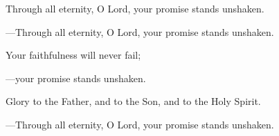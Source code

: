 \responsory
\begin{hangpar}

Through all eternity, O Lord, your promise stands unshaken.

{\color{red}---\thinspace}Through all eternity, O Lord, your promise stands unshaken.

\medskip Your faithfulness will never fail;

{\color{red}---\thinspace}your promise stands unshaken.

\medskip Glory to the Father, and to the Son, and to the Holy Spirit.

{\color{red}---\thinspace}Through all eternity, O Lord, your promise stands unshaken.
\end{hangpar}
